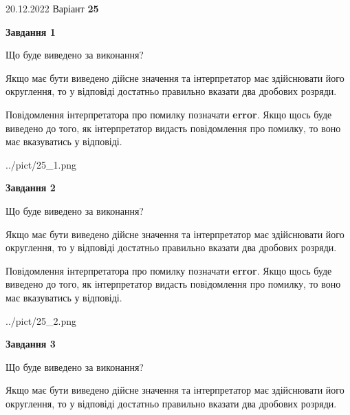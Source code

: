 \documentclass[12pt, ukrainian]{article}
\begin{document}
{20.12.2022 Варіант \No \textbf { 25 }\par}
{
\begin {Large}

{\begin {center}\textbf{Завдання 1}\end {center}}\par
Що буде виведено за виконання? \par

Якщо має бути виведено дійсне значення та інтерпретатор має здійснювати його округлення, 
то у відповіді достатньо правильно вказати два дробових розряди.

Повідомлення інтерпретатора про помилку позначати \textbf{error}.
Якщо щось буде виведено до того, як інтерпретатор видасть повідомлення про помилку, 
то воно має вказуватись у відповіді. \par

\begin{center}
	{../pict/25_1.png}
\end{center}
\newpage

{\begin {center}\textbf{Завдання 2}\end {center}}\par
Що буде виведено за виконання? \par

Якщо має бути виведено дійсне значення та інтерпретатор має здійснювати його округлення, 
то у відповіді достатньо правильно вказати два дробових розряди.

Повідомлення інтерпретатора про помилку позначати \textbf{error}.
Якщо щось буде виведено до того, як інтерпретатор видасть повідомлення про помилку, 
то воно має вказуватись у відповіді. \par

\begin{center}
	{../pict/25_2.png}
\end{center}
\newpage

{\begin {center}\textbf{Завдання 3}\end {center}}\par
Що буде виведено за виконання? \par

Якщо має бути виведено дійсне значення та інтерпретатор має здійснювати його округлення, 
то у відповіді достатньо правильно вказати два дробових розряди.


\end{Large}}
\end{document}
